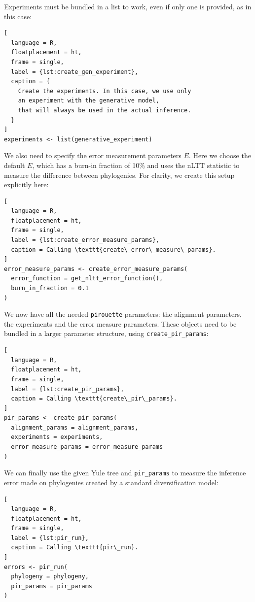 Experiments must be bundled in a list to work, even if only one is provided, as 
in this case:

\begin{lstlisting}[
  language = R, 
  floatplacement = ht,
  frame = single,
  label = {lst:create_gen_experiment},
  caption = {
    Create the experiments. In this case, we use only
    an experiment with the generative model,
    that will always be used in the actual inference.
  }
]
experiments <- list(generative_experiment)
\end{lstlisting}

We also need to specify the error measurement parameters $\mathit{E}$.
Here we choose the default $\mathit{E}$, which has a burn-in fraction 
of 10\% and uses the nLTT statistic to
measure the difference between phylogenies. For clarity,
we create this setup explicitly here:

\begin{lstlisting}[
  language = R,
  floatplacement = ht,
  frame = single,
  label = {lst:create_error_measure_params},
  caption = Calling \texttt{create\_error\_measure\_params}.
]
error_measure_params <- create_error_measure_params(
  error_function = get_nltt_error_function(),
  burn_in_fraction = 0.1
)
\end{lstlisting}

We now have all the needed \verb;pirouette; parameters: the alignment 
parameters, the experiments and the error measure parameters.
These objects need to be bundled in a larger parameter structure, 
using \verb;create_pir_params;:

\begin{lstlisting}[
  language = R,
  floatplacement = ht,
  frame = single,
  label = {lst:create_pir_params},
  caption = Calling \texttt{create\_pir\_params}.
]
pir_params <- create_pir_params(
  alignment_params = alignment_params,
  experiments = experiments,
  error_measure_params = error_measure_params
)
\end{lstlisting}

We can finally use the given Yule tree and \verb;pir_params; to measure the 
inference error made on phylogenies
created by a standard diversification model:

\begin{lstlisting}[
  language = R,
  floatplacement = ht,
  frame = single,
  label = {lst:pir_run},
  caption = Calling \texttt{pir\_run}.
]
errors <- pir_run(
  phylogeny = phylogeny,
  pir_params = pir_params
)
\end{lstlisting}

